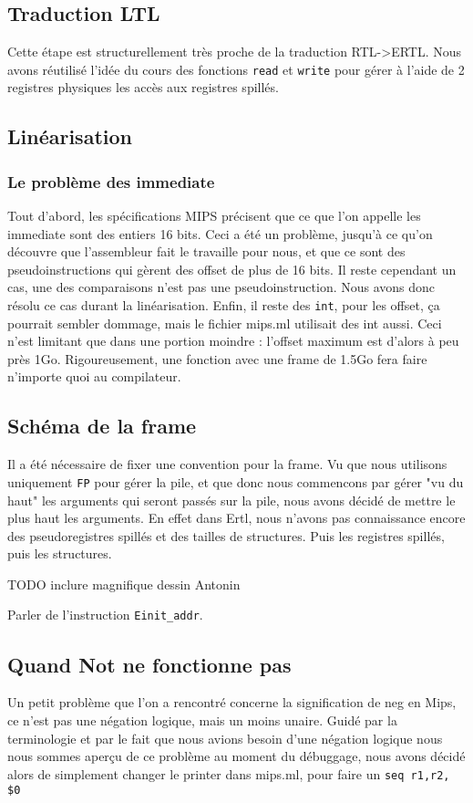 \documentclass[a4paper]{article}
\begin{document}
\subsection{Traduction LTL}

Cette étape est structurellement très proche de la traduction RTL->ERTL.
Nous avons réutilisé l'idée du cours des fonctions \texttt{read} et
\texttt{write} pour gérer à l'aide de 2 registres physiques
les accès aux registres spillés. 

\subsection{Linéarisation}

\subsubsection{Le problème des immediate}
Tout d'abord, les spécifications MIPS précisent que ce que l'on appelle
les
 immediate sont des entiers 16 bits. Ceci a été un problème, jusqu'à ce
 qu'on découvre que l'assembleur fait le travaille pour nous, et que ce
 sont des pseudoinstructions qui gèrent des offset de plus de 16 bits.
 Il reste cependant un cas, une des comparaisons n'est pas une
 pseudoinstruction. Nous avons donc résolu ce cas durant la linéarisation.
Enfin, il reste des \texttt{int}, pour les offset, ça pourrait sembler
dommage, mais le fichier mips.ml utilisait des int aussi. Ceci
n'est limitant que dans une portion moindre : l'offset maximum est
d'alors à peu près 1Go. Rigoureusement, une fonction avec une frame de 1.5Go fera
faire n'importe quoi au compilateur.

\subsection{Schéma de la frame}

Il a été nécessaire de fixer une convention pour la frame. Vu que nous
utilisons uniquement \texttt{FP} pour gérer la pile, 
et que donc nous commencons par gérer "vu du haut"
les arguments qui seront passés sur la pile, nous avons décidé de mettre
le plus haut les arguments. En effet dans Ertl, nous n'avons pas
connaissance encore des pseudoregistres spillés et des tailles de
structures. Puis les registres spillés, puis les structures.
 
TODO inclure magnifique dessin Antonin

 Parler de l'instruction \texttt{Einit\_addr}.
\subsection{Quand Not ne fonctionne pas}
Un petit problème que l'on a rencontré concerne la signification de neg
en Mips, ce n'est pas une négation logique, mais un moins unaire. Guidé
par la terminologie et par le fait que nous avions besoin d'une négation
logique nous nous sommes aperçu de ce problème au moment du débuggage,
nous avons décidé alors de simplement changer le printer dans mips.ml,
pour faire un \texttt{seq r1,r2, \$0}
\end{document}
